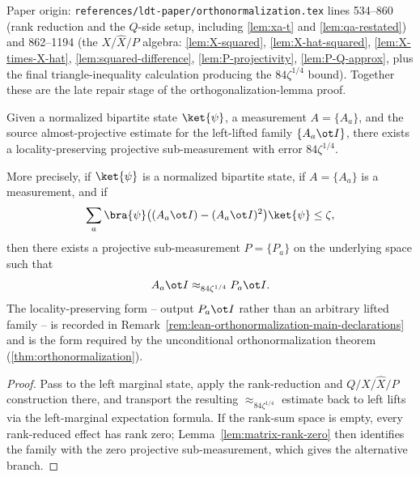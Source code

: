 \begin{lemma}\label{lem:locality-preserving-projectivization}
	\leanok
	Paper origin: \texttt{references/ldt-paper/orthonormalization.tex} lines 534--860 (rank reduction and the $Q$-side setup, including \ref{lem:xa-t} and \ref{lem:qa-restated}) and 862--1194 (the $X/\widehat X/P$ algebra: \ref{lem:X-squared}, \ref{lem:X-hat-squared}, \ref{lem:X-times-X-hat}, \ref{lem:squared-difference}, \ref{lem:P-projectivity}, \ref{lem:P-Q-approx}, plus the final triangle-inequality calculation producing the $84\zeta^{1/4}$ bound). Together these are the late repair stage of the orthogonalization-lemma proof.

	Given a normalized bipartite state $\ket{\psi}$, a measurement
	$A = \{A_a\}$, and the source almost-projective estimate for the
	left-lifted family $\{A_a \ot I\}$, there exists a locality-preserving
	projective sub-measurement with error $84\zeta^{1/4}$.

	More precisely, if $\ket{\psi}$ is a normalized bipartite state, if
	$A = \{A_a\}$ is a measurement, and if
	\[
		\sum_a \bra{\psi} \bigl((A_a \ot I) - (A_a \ot I)^2\bigr) \ket{\psi} \le \zeta,
	\]
	then there exists a projective sub-measurement $P = \{P_a\}$ on the underlying
	space such that
	\[
		A_a \ot I \approx_{84\zeta^{1/4}} P_a \ot I.
	\]
	The locality-preserving form -- output $P_a \ot I$ rather than an arbitrary
	lifted family -- is recorded in
	Remark~\ref{rem:lean-orthonormalization-main-declarations} and is the form
	required by the unconditional orthonormalization theorem
	(\ref{thm:orthonormalization}).
\end{lemma}
\begin{proof}
	\leanok
	Pass to the left marginal state, apply the rank-reduction and
	$Q/X/\widehat X/P$ construction there, and transport the resulting
	$\approx_{84\zeta^{1/4}}$ estimate back to left lifts via the left-marginal
	expectation formula. If the rank-sum space is empty, every rank-reduced effect
	has rank zero; Lemma~\ref{lem:matrix-rank-zero} then identifies the family
	with the zero projective sub-measurement, which gives the alternative branch.
\end{proof}

